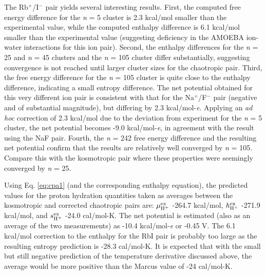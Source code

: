 \begin{cpa}
  The Rb$^+$/I$^-$ pair yields several interesting results. First, the computed free energy difference for the \emph{n} = 5 cluster is 2.3 kcal/mol smaller than the experimental 
  value, while the computed enthalpy difference is 6.1 kcal/mol smaller than the experimental value (suggesting deficiency in the AMOEBA ion-water interactions for this ion pair). 
  Second, the enthalpy differences for the \emph{n} = 25 and \emph{n} = 45 clusters and the \emph{n} = 105 cluster differ substantially, suggesting convergence is not reached until
  larger cluster sizes for the chaotropic pair. Third, the free energy difference for the \emph{n} = 105 cluster is quite close to the enthalpy difference, indicating a small entropy
  difference. The net potential obtained for this very different ion pair is consistent with that for the Na$^+$/F$^-$ pair (negative and of substantial magnitude), but differing 
  by 2.3 kcal/mol-\emph{e}. Applying an \emph{ad hoc} correction of 2.3 kcal/mol due to the deviation from experiment for the \emph{n} = 5 cluster, the net potential becomes -9.0
  kcal/mol-\emph{e}, in agreement with the result using the NaF pair. Fourth, the \emph{n} = 242 free energy difference and the resulting net potential confirm that the results 
  are relatively well converged by \emph{n} = 105. Compare this with the kosmotropic pair where these properties were seemingly converged by \emph{n} = 25.

  Using Eq. \ref{eq:cpa1} (and the corresponding enthalpy equation), the predicted values for the proton hydration quantities taken as averages between the kosmotropic and corrected
  chaotropic pairs are: $\mu^{\mathrm{ex}}_{\mathrm{H^{\mathrm{+}}}}$ -264.7 kcal/mol, $h^{\mathrm{ex}}_{\mathrm{H^{\mathrm{+}}}}$ -271.9 kcal/mol, and $s^{\mathrm{ex}}_{\mathrm{H^{\mathrm{+}}}}$ -24.0 cal/mol-K. The net potential is
  estimated (also as an average of the two measurements) as -10.4 kcal/mol-\emph{e} or -0.45 V. The 6.1 kcal/mol correction to the enthalpy for the RbI pair is probably too large
  as the resulting entropy prediction is -28.3 cal/mol-K. It is expected that with the small but still negative prediction of the temperature derivative discussed above, the average
  would be more positive than the Marcus value of -24 cal/mol-K\cite{marcus1985book}.


\end{cpa}
